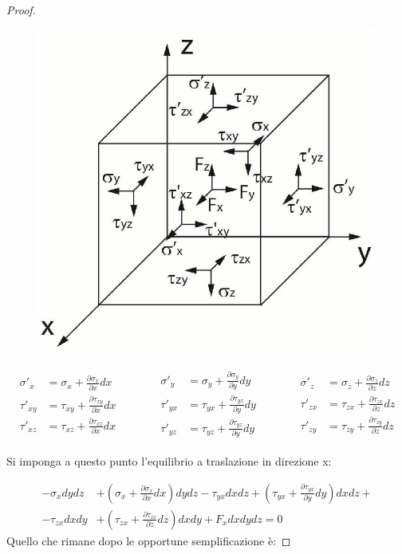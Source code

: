 \documentclass{article}
\begin{document}
\begin{adjustwidth}{2in}{}
\begin{proof}
\begin{figure}[H]
	\centering
	\includegraphics[width=0.3\linewidth]{immagini/1.PARTE7_Pagina_11}
\end{figure}
	\[
	\begin{array}{c}
		\begin{aligned}
		\sigma'_x & = \sigma_x + \frac{\partial \sigma_x}{\partial x} dx \\
		\tau'_{xy} & = \tau_{xy} + \frac{\partial \tau_{xy}}{\partial x} dx \\
		\tau'_{xz} & = \tau_{xz} + \frac{\partial \tau_{xz}}{\partial x} dx
		\end{aligned}
	\end{array} \hspace{1cm} \begin{array}{c}
	\begin{aligned}
		\sigma'_y & = \sigma_y + \frac{\partial \sigma_y}{\partial y} dy \\
		\tau'_{yx} & = \tau_{yx} + \frac{\partial \tau_{yx}}{\partial y} dy \\
		\tau'_{yz} & = \tau_{yz} + \frac{\partial \tau_{yz}}{\partial y} dy
	\end{aligned}
	\end{array} \hspace{1cm} \begin{array}{c}
	\begin{aligned}
		\sigma'_z & = \sigma_z + \frac{\partial \sigma_z}{\partial z} dz \\
		\tau'_{zx} & = \tau_{zx} + \frac{\partial \tau_{zx}}{\partial z} dz \\
		\tau'_{zy} & = \tau_{zy} + \frac{\partial \tau_{zy}}{\partial z} dz
	\end{aligned}
	\end{array}
	\]	
	
	Si imponga a questo punto l'equilibrio a traslazione in direzione x:
	
	\[
	\begin{split}
		-\sigma_x dydz & + \left( \sigma_x + \frac{\partial \sigma_x}{\partial x} dx\right) dydz - \tau_{yx}dxdz + \left( \tau_{yx} + \frac{\partial \tau_{yx}}{\partial y} dy\right) dxdz + \\
		-\tau_{zx} dxdy & + \left( \tau_{zx} + \frac{\partial \tau_{zx}}{\partial z} dz \right) dxdy + F_x dx dy dz = 0
	\end{split}
	\]
	Quello che rimane dopo le opportune semplificazione è: 
	

\end{proof}
\end{adjustwidth}
\end{document}

